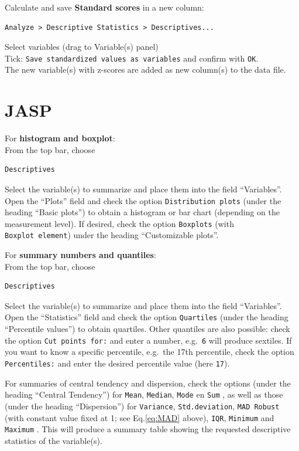 \documentclass[
]{book}
\begin{document}
Calculate and save \textbf{Standard scores} in a new column:\\

\begin{verbatim}
Analyze > Descriptive Statistics > Descriptives...
\end{verbatim}

Select variables (drag to Variable(s) panel)\\
Tick: \texttt{Save\ standardized\ values\ as\ variables} and confirm with \texttt{OK}.\\
The new variable(s) with z-scores are added as new
column(s) to the data file.\\

\hypertarget{jasp-3}{%
\section{JASP}\label{jasp-3}}

For \textbf{histogram and boxplot}:\\
From the top bar, choose

\begin{verbatim}
Descriptives
\end{verbatim}

Select the variable(s) to summarize and place them into the field ``Variables''. Open the ``Plots'' field and check the option \texttt{Distribution\ plots} (under the heading ``Basic plots'') to obtain a histogram or bar chart (depending on the measurement level).
If desired, check the option \texttt{Boxplots} (with \texttt{Boxplot\ element}) under the heading ``Customizable plots''.

For \textbf{summary numbers and quantiles}:\\
From the top bar, choose

\begin{verbatim}
Descriptives
\end{verbatim}

Select the variable(s) to summarize and place them into the field ``Variables''. Open the ``Statistics'' field and check the option \texttt{Quartiles} (under the heading ``Percentile values'') to obtain quartiles.
Other quantiles are also possible: check the option \texttt{Cut\ points\ for:} and enter a number, e.g.~\texttt{6} will produce sextiles. If you want to know a specific percentile, e.g.~the 17th percentile, check the option \texttt{Percentiles:} and enter the desired percentile value (here \texttt{17}).

For summaries of central tendency and dispersion, check the options (under the heading ``Central Tendency'') for \texttt{Mean}, \texttt{Median}, \texttt{Mode} en \texttt{Sum} , as well as those (under the heading ``Dispersion'') for \texttt{Variance}, \texttt{Std.deviation}, \texttt{MAD\ Robust} (with constant value fixed at 1; see Eq.\eqref{eq:MAD} above), \texttt{IQR}, \texttt{Minimum} and \texttt{Maximum} . This will produce a summary table showing the requested descriptive statistics of the variable(s).
\end{document}
